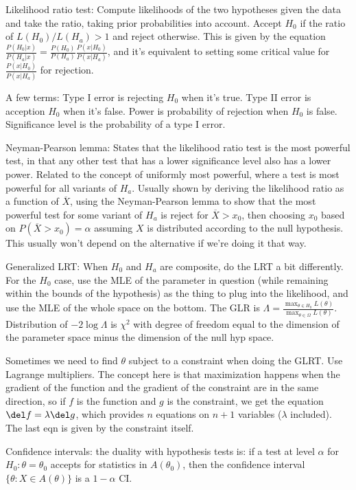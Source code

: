 \documentclass{article}
\newcommand{\conj}{\overline}
\begin{document}
Likelihood ratio test: Compute likelihoods of the two hypotheses given the data and take the ratio, taking prior probabilities into account. Accept $H_0$ if the ratio of $L(H_0)/L(H_a)>1$ and reject otherwise. This is given by the equation $\frac{P(H_0|x)}{P(H_a|x)}=\frac{P(H_0)}{P(H_a)}\frac{P(x|H_0)}{P(x|H_a)}$, and it's equivalent to setting some critical value for $\frac{P(x|H_0)}{P(x|H_a)}$ for rejection.

A few terms: Type I error is rejecting $H_0$ when it's true. Type II error is acception $H_0$ when it's false. Power is probability of rejection when $H_0$ is false. Significance level is the probability of a type I error.

Neyman-Pearson lemma: States that the likelihood ratio test is the most powerful test, in that any other test that has a lower significance level also has a lower power. Related to the concept of uniformly most powerful, where a test is most powerful for all variants of $H_a$. Usually shown by deriving the likelihood ratio as a function of $\conj{X}$, using the Neyman-Pearson lemma to show that the most powerful test for some variant of $H_a$ is reject for $\conj{X}>x_0$, then choosing $x_0$ based on $P(\conj{X}>x_0)=\alpha$ assuming $X$ is distributed according to the null hypothesis. This usually won't depend on the alternative if we're doing it that way.

Generalized LRT: When $H_0$ and $H_a$ are composite, do the LRT a bit differently. For the $H_0$ case, use the MLE of the parameter in question (while remaining within the bounds of the hypothesis) as the thing to plug into the likelihood, and use the MLE of the whole space on the bottom. The GLR is $\Lambda=\frac{\max_{\theta\in H_0}L(\theta)}{\max_{\theta\in\Omega}L(\theta)}$. Distribution of $-2\log\Lambda$ is $\chi^2$ with degree of freedom equal to the dimension of the parameter space minus the dimension of the null hyp space.

Sometimes we need to find $\theta$ subject to a constraint when doing the GLRT. Use Lagrange multipliers. The concept here is that maximization happens when the gradient of the function and the gradient of the constraint are in the same direction, so if $f$ is the function and $g$ is the constraint, we get the equation $\del f=\lambda\del g$, which provides $n$ equations on $n+1$ variables ($\lambda$ included). The last eqn is given by the constraint itself.

Confidence intervals: the duality with hypothesis tests is: if a test at level $\alpha$ for $H_0:\theta=\theta_0$ accepts for statistics in $A(\theta_0)$, then the confidence interval $\{\theta:X\in A(\theta)\}$ is a $1-\alpha$ CI.
\end{document}
